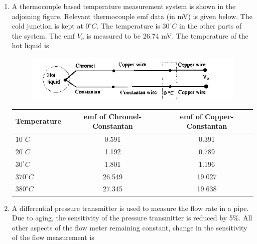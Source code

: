 \documentclass[journal,12pt,onecolumn]{IEEEtran}
\theoremstyle{remark}
\begin{document}
\begin{enumerate}
\vspace{0.5cm}

\item A thermocouple based temperature measurement system is shown in the adjoining figure. Relevant thermocouple emf data (in mV) is given below. The cold junction is kept at $0^\circ C$. The temperature is $30^\circ C$ in the other parts of the system. The emf $V_o$ is measured to be 26.74 mV. The temperature of the hot liquid is
\begin{figure}[h]
    \centering
    \includegraphics[scale=0.75]{q35}
    \caption*{}
    \label{fig:placeholder}
\end{figure}
\begin{center}
\begin{tabular}{|l|c|c|}
    \hline
    \textbf{Temperature} & \textbf{emf of Chromel-Constantan} & \textbf{emf of Copper-Constantan} \\
    \hline
    $10^\circ C$ & 0.591 & 0.391 \\
    \hline
    $20^\circ C$ & 1.192 & 0.789 \\
    \hline
    $30^\circ C$ & 1.801 & 1.196 \\
    \hline
    $370^\circ C$ & 26.549 & 19.027 \\
    \hline
    $380^\circ C$ & 27.345 & 19.638 \\
    \hline
\end{tabular}
\end{center}
\begin{enumerate}  \end{enumerate}

\vspace{0.5cm}

\item A differential pressure transmitter is used to measure the flow rate in a pipe. Due to aging, the sensitivity of the pressure transmitter is reduced by 5\%. All other aspects of the flow meter remaining constant, change in the sensitivity of the flow measurement is
\hfill{}\begin{enumerate}  \end{enumerate}


\end{enumerate}
\end{document}
